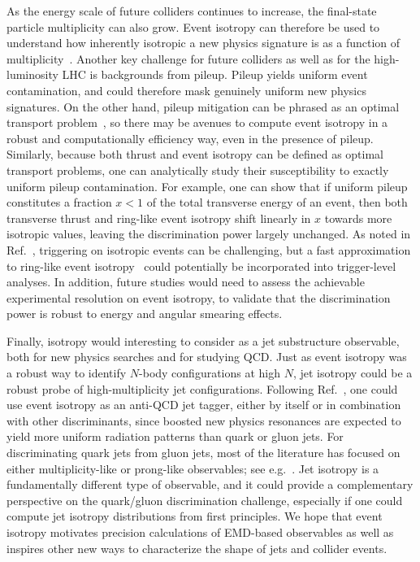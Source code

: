 \documentclass[letterpaper,11pt]{article}
\DeclareRobustCommand{\Ref}[1]{Ref.~\cite{#1}}
\begin{document}
As the energy scale of future colliders continues to increase, the final-state particle multiplicity can also grow.
%
Event isotropy can therefore be used to understand how inherently isotropic a new physics signature is as a function of multiplicity~\cite{cesarotti:2020mm}. 
%
Another key challenge for future colliders as well as for the high-luminosity LHC is backgrounds from pileup.
%
Pileup yields uniform event contamination, and could therefore mask genuinely uniform new physics signatures.
%
On the other hand, pileup mitigation can be phrased as an optimal transport problem~\cite{Komiske:2020qhg}, so there may be avenues to compute event isotropy in a robust and computationally efficiency way, even in the presence of pileup.
%
Similarly, because both thrust and event isotropy can be defined as optimal transport problems, one can analytically study their susceptibility to exactly uniform pileup contamination.
%
For example, one can show that if uniform pileup constitutes a fraction $x < 1$ of the total transverse energy of an event, then both transverse thrust and ring-like event isotropy shift linearly in $x$ towards more isotropic values, leaving the discrimination power largely unchanged.
%
As noted in \Ref{Knapen:2016hky}, triggering on isotropic events can be challenging, but a fast approximation to ring-like event isotropy~\cite{Rabin:2011jd} could potentially be incorporated into trigger-level analyses.
%
In addition, future studies would need to assess the achievable experimental resolution on event isotropy, to validate that the discrimination power is robust to energy and angular smearing effects. 

Finally, isotropy would interesting to consider as a jet substructure observable, both for new physics searches and for studying QCD.
%
Just as event isotropy was a robust way to identify $N$-body configurations at high $N$, jet isotropy could be a robust probe of high-multiplicity jet configurations.
%
Following \Ref{Aguilar-Saavedra:2017rzt}, one could use event isotropy as an anti-QCD jet tagger, either by itself or in combination with other discriminants, since boosted new physics resonances are expected to yield more uniform radiation patterns than quark or gluon jets.
%
For discriminating quark jets from gluon jets, most of the literature has focused on either multiplicity-like or prong-like observables; see e.g.~\cite{Gallicchio:2012ez,Gras:2017jty,Frye:2017yrw,Larkoski:2019nwj}.
%
Jet isotropy is a fundamentally different type of observable, and it could provide a complementary perspective on the quark/gluon discrimination challenge, especially if one could compute jet isotropy distributions from first principles.
%
%
We hope that event isotropy motivates precision calculations of EMD-based observables as well as inspires other new ways to characterize the shape of jets and collider events.
\end{document}
